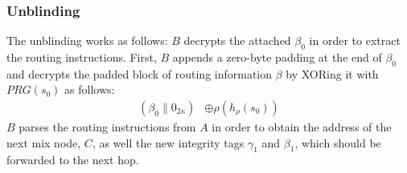 \subsubsection{Unblinding}
\label{sec:sphinx:unblinding}

The unblinding works as follows: $B$ decrypts the attached $\beta_0$ in order to extract the routing instructions. First, $B$ appends a zero-byte padding at the end of $\beta_0$ and decrypts the padded block of routing information $\beta$ by XORing it with $PRG(s_{0})$ as follows:
\begin{align}
    (\beta_0\|0_{2\kappa}) & \oplus \rho(h_{\rho}(s_{0}))
\end{align}
$B$ parses the routing instructions from $A$ in order to obtain the address of the next mix node, $C$, as well the new integrity tags $\gamma_1$ and $\beta_1$, which should be forwarded to the next hop.